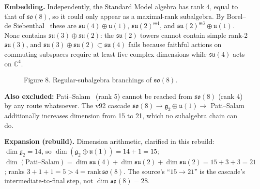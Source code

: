 \documentclass[11pt,a4paper]{article}
\newcommand{\expansion}[1]{\par\smallskip\noindent\textbf{Expansion (rebuild).} #1\par\smallskip}
\begin{document}
\textbf{Embedding.} Independently, the Standard Model algebra has rank 4, equal to that of $\mathfrak{so}(8)$, so it could only appear as a maximal-rank subalgebra. By Borel--de Siebenthal~\cite{borel1949} these are $\mathfrak{su}(4) \oplus \mathfrak{u}(1)$, $\mathfrak{su}(2)^{\oplus 4}$, and $\mathfrak{su}(2)^{\oplus 3} \oplus \mathfrak{u}(1)$. None contains $\mathfrak{su}(3) \oplus \mathfrak{su}(2)$: the $\mathfrak{su}(2)$ towers cannot contain simple rank-2 $\mathfrak{su}(3)$, and $\mathfrak{su}(3) \oplus \mathfrak{su}(2) \subset \mathfrak{su}(4)$ fails because faithful actions on commuting subspaces require at least five complex dimensions while $\mathfrak{su}(4)$ acts on $\mathbb{C}^4$.
\begin{figure}[h]
\centering
{}
\caption{Figure 8. Regular-subalgebra branchings of $\mathfrak{so}(8)$.}
\end{figure}
\textbf{Also excluded:} Pati--Salam~\cite{pati1974} (rank 5) cannot be reached from $\mathfrak{so}(8)$ (rank 4) by any route whatsoever. The v92 cascade $\mathfrak{so}(8) \to \mathfrak{g}_2 \oplus \mathfrak{u}(1) \to$ Pati--Salam additionally increases dimension from 15 to 21, which no subalgebra chain can do.
\expansion{Dimension arithmetic, clarified in this rebuild: $\dim\mathfrak{g}_2 = 14$, so $\dim(\mathfrak{g}_2 \oplus \mathfrak{u}(1)) = 14 + 1 = 15$; $\dim(\text{Pati--Salam}) = \dim\mathfrak{su}(4) + \dim\mathfrak{su}(2) + \dim\mathfrak{su}(2) = 15 + 3 + 3 = 21$; ranks $3 + 1 + 1 = 5 > 4 = \mathrm{rank}\,\mathfrak{so}(8)$. The source's ``$15 \to 21$'' is the cascade's intermediate-to-final step, not $\dim\mathfrak{so}(8) = 28$.}
\end{document}
